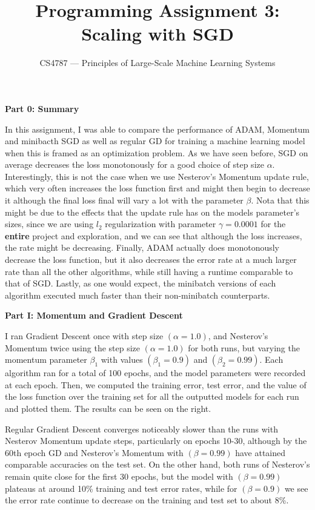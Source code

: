 \documentclass[10pt]{article}
\begin{document}

\title{Programming Assignment 3: Scaling with SGD}
\author{CS4787 --- Principles of Large-Scale Machine Learning Systems}
\date{}

\maketitle
\begin{multicols}{2} 
\noindent
\textbf{Part 0: Summary} \par
In this assignment, I was able to compare the performance of ADAM, Momentum and minibacth SGD as well as regular GD for training a machine learning model when this is framed as an optimization problem. As we have seen before, SGD on average decreases the loss monotonously for a good choice of step size $\alpha$. Interestingly, this is not the case when we use Nesterov's Momentum update rule, which very often increases the loss function first and might then begin to decrease it although the final loss final will vary a lot with the parameter $\beta$. Nota that this might be due to the effects that the update rule has on the models parameter's sizes, since we are using $l_2$ regularization with parameter $\gamma= 0.0001$ for the \textbf{entire} project and exploration, and we can see that although the loss increases, the rate might be decreasing. Finally, ADAM actually does monotonously decrease the loss function, but it also decreases the error rate at a much larger rate than all the other algorithms, while still having a runtime comparable to that of SGD.  Lastly, as one would expect, the minibatch versions of each algorithm executed much faster than their non-minibatch counterparts.\par 
\noindent
\textbf{Part I: Momentum and Gradient Descent}\par 
I ran Gradient Descent once with step size $(\alpha = 1.0)$, and Nesterov's Momentum twice using the step size $(\alpha = 1.0)$ for both runs, but varying the momentum parameter $\beta_1$ with values $(\beta_1=0.9)$ and $(\beta_2 = 0.99)$. Each algorithm ran for a total of 100 epochs, and the model parameters were recorded at each epoch. Then, we computed the training error, test error, and the value of the loss function over the training set for all the outputted models for each run and plotted them. The results can be seen on the right. \par
Regular Gradient Descent converges noticeably slower than the runs with Nesterov Momentum update steps, particularly on epochs 10-30, although by the 60th epoch GD and Nesterov's Momentum with $(\beta=0.99)$ have attained comparable accuracies on the test set. On the other hand, both runs of Nesterov's remain quite close for the first 30 epochs, but the model with $(\beta=0.99)$ plateaus at around 10\% training and test error rates, while for $(\beta=0.9)$ we see the error rate continue to decrease on the training and test set to about 8\%.\par 

\end{multicols}
\end{document}
